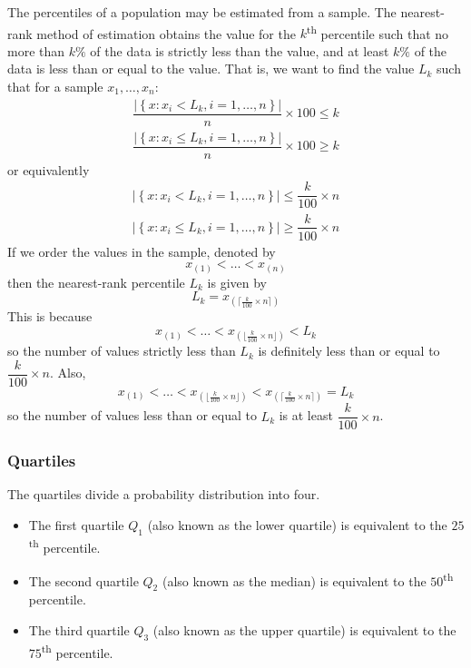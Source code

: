 \documentclass[11pt]{report} %
\begin{document}
The percentiles of a population may be estimated from a sample. The nearest-rank method of estimation obtains the value for the $k$\textsuperscript{th} percentile such that no more than $k\%$ of the data is strictly less than the value, and at least $k\%$ of the data is less than or equal to the value. That is, we want to find the value $L_{k}$ such that for a sample $x_{1}, \dots, x_{n}$:
\begin{gather}
\dfrac{\left|\left\{x: x_{i} < L_{k}, i = 1, \dots, n\right\}\right|}{n}\times 100 \leq k \\
\dfrac{\left|\left\{x: x_{i} \leq L_{k}, i = 1, \dots, n\right\}\right|}{n} \times 100 \geq k
\end{gather}
or equivalently
\begin{gather}
\left|\left\{x: x_{i} < L_{k}, i = 1, \dots, n\right\}\right|  \leq \dfrac{k}{100}\times n \\
\left|\left\{x: x_{i} \leq L_{k}, i = 1, \dots, n\right\}\right| \geq \dfrac{k}{100}\times n
\end{gather}
If we order the values in the sample, denoted by
\begin{equation}
x_{\left(1\right)} < \dots < x_{\left(n\right)}
\end{equation}
then the nearest-rank percentile $L_{k}$ is given by
\begin{equation}
L_{k} = x_{\left(\lceil \frac{k}{100} \times n\rceil\right)}
\end{equation}
This is because
\begin{equation}
x_{\left(1\right)} < \dots < x_{\left(\lfloor\frac{k}{100} \times n\rfloor\right)} < L_{k}
\end{equation}
so the number of values strictly less than $L_{k}$ is definitely less than or equal to $\dfrac{k}{100} \times n$. Also,
\begin{equation}
x_{\left(1\right)} < \dots < x_{\left(\lfloor\frac{k}{100} \times n\rfloor\right)} < x_{\left(\lceil\frac{k}{100} \times n\rceil\right)} = L_{k}
\end{equation}
so the number of values less than or equal to $L_{k}$ is at least $\dfrac{k}{100} \times n$.

\subsubsection{Quartiles}

The quartiles divide a probability distribution into four.
\begin{itemize}
\item The first quartile $Q_{1}$ (also known as the lower quartile) is equivalent to the $25$\textsuperscript{th} percentile.
\item The second quartile $Q_{2}$ (also known as the median) is equivalent to the $50$\textsuperscript{th} percentile.
\item The third quartile $Q_{3}$ (also known as the upper quartile) is equivalent to the $75$\textsuperscript{th} percentile.
\end{itemize}
\end{document}
